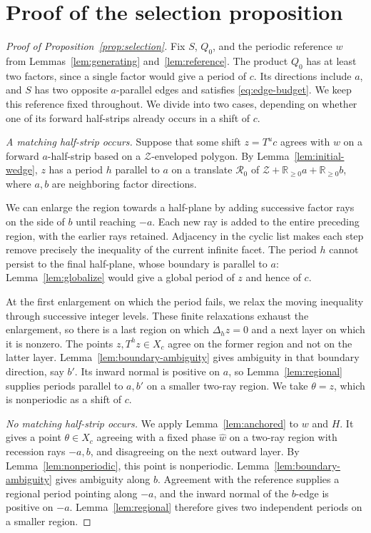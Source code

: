 \documentclass[11pt]{article}
\numberwithin{equation}{section}
\theoremstyle{definition}
\theoremstyle{remark}
\newcommand{\R}{\mathbb R}
\newcommand{\Del}[1]{\Delta_{#1}}
\newcommand{\ZZ}{\mathcal Z}
\newcommand{\RR}{\mathcal R}
\begin{document}
\section{Proof of the selection proposition}\label{sec:selection-proof}
\begin{proof}[Proof of Proposition~\ref{prop:selection}]
Fix $S$, $Q_0$, and the periodic reference $w$ from Lemmas~\ref{lem:generating}
and~\ref{lem:reference}. The product $Q_0$ has at least two factors, since a single factor would
give a period of $c$. Its directions include $a$, and $S$ has two opposite $a$-parallel edges and
satisfies \eqref{eq:edge-budget}. We keep this reference fixed throughout. We divide into two cases, depending on
whether one of its forward half-strips already occurs in a shift of $c$.

\emph{A matching half-strip occurs.} Suppose that some shift $z=T^uc$ agrees with $w$ on a forward $a$-half-strip based on a $\ZZ$-enveloped polygon. By Lemma~\ref{lem:initial-wedge}, $z$ has a period $h$ parallel to $a$ on a translate $\RR_0$ of $\ZZ+\R_{\ge0}a+\R_{\ge0}b$, where $a,b$ are neighboring factor directions.

We can enlarge the region towards a half-plane by adding successive factor rays on the side of $b$
until reaching $-a$. Each new ray is added to the entire preceding region, with the earlier rays
retained. Adjacency in the cyclic list makes each step remove precisely the inequality of the
current infinite facet. The period $h$ cannot persist to the final half-plane, whose boundary is
parallel to $a$: Lemma~\ref{lem:globalize} would give a global period of $z$ and hence of $c$.

At the first enlargement on which the period fails, we relax the moving inequality through successive integer levels. These finite relaxations exhaust the enlargement, so there is a last region on which
$\Del h z=0$ and a next layer on which it is nonzero. The points $z,T^hz\in X_c$ agree on the former
region and not on the latter layer. Lemma~\ref{lem:boundary-ambiguity} gives ambiguity in that
boundary direction, say $b'$. Its inward normal is positive on $a$, so Lemma~\ref{lem:regional}
supplies periods parallel to $a,b'$ on a smaller two-ray region. We take $\theta=z$, which is
nonperiodic as a shift of $c$.

\emph{No matching half-strip occurs.} We apply Lemma~\ref{lem:anchored} to $w$ and $H$. It gives a point $\theta\in X_c$ agreeing with a fixed phase $\widehat w$ on a two-ray region with recession rays $-a,b$, and disagreeing on the next outward layer. By Lemma~\ref{lem:nonperiodic}, this point is nonperiodic. Lemma~\ref{lem:boundary-ambiguity} gives ambiguity along $b$. Agreement with the reference supplies a regional period pointing along $-a$, and the inward normal of the $b$-edge is positive on $-a$. Lemma~\ref{lem:regional} therefore gives two independent periods on a smaller region.


\end{proof}
\end{document}
